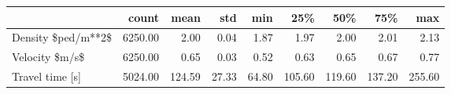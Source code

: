 \begin{tabular}{lrrrrrrrr}
\toprule
{} &   count &   mean &   std &   min &    25\% &    50\% &    75\% &    max \\
\midrule
Density \$ped/m**2\$ & 6250.00 &   2.00 &  0.04 &  1.87 &   1.97 &   2.00 &   2.01 &   2.13 \\
Velocity \$m/s\$     & 6250.00 &   0.65 &  0.03 &  0.52 &   0.63 &   0.65 &   0.67 &   0.77 \\
Travel time [s]    & 5024.00 & 124.59 & 27.33 & 64.80 & 105.60 & 119.60 & 137.20 & 255.60 \\
\bottomrule
\end{tabular}
